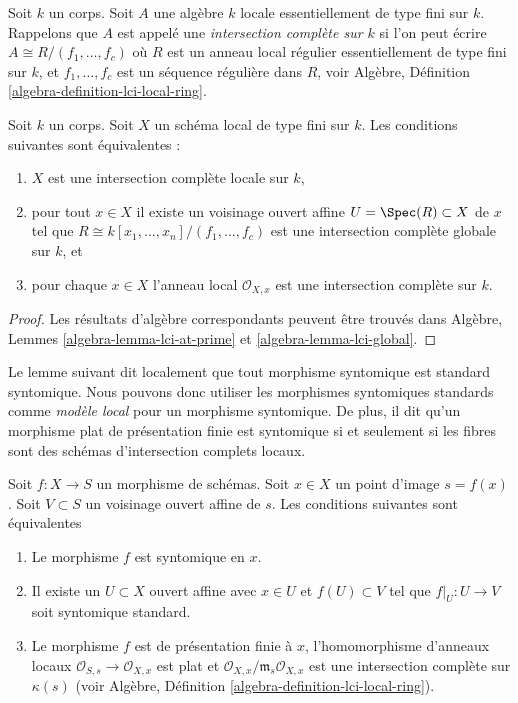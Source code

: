 \noindent
Soit $k$ un corps. Soit $A$ une algèbre $k$ locale
essentiellement de type fini sur $k$. Rappelons que
$A$ est appelé une {\it intersection
complète sur $k$} si l'on peut écrire $A \cong R/(f_1, \ldots, f_c)$ où $R$
est un anneau local régulier essentiellement de type fini sur $k$,
et $f_1, \ldots, f_c$ est un séquence
régulière dans $R$, voir Algèbre, Définition \ref{algebra-definition-lci-local-ring}.

\begin{lemma}
\label{lemma-local-complete-intersection}
Soit $k$ un corps.
Soit $X$ un schéma local de type fini sur $k$. Les conditions
suivantes sont équivalentes :
\begin{enumerate}
\item $X$ est une intersection complète locale sur $k$,
\item pour tout $x \in X$ il existe un voisinage
ouvert affine $U = \Spec(R) \subset X$ de $x$
tel que $R \cong k[x_1, \ldots, x_n]/(f_1, \ldots, f_c)$ est une intersection
complète globale sur $k$, et
\item pour chaque $x \in X$ l'anneau local $\mathcal{O}_{X, x}$ est une intersection
complète sur $k$.
\end{enumerate}
\end{lemma}

\begin{proof}
Les résultats d'algèbre correspondants peuvent
être trouvés dans Algèbre, Lemmes \ref{algebra-lemma-lci-at-prime}
et \ref{algebra-lemma-lci-global}.
\end{proof}

\noindent
Le lemme suivant dit localement que tout morphisme syntomique est standard syntomique. Nous pouvons
donc utiliser les morphismes syntomiques standards comme {\it modèle
local} pour un morphisme syntomique. De plus, il dit qu'un morphisme plat de présentation
finie est syntomique si et seulement si les fibres sont des schémas d'intersection
complets locaux.

\begin{lemma}
\label{lemma-syntomic-locally-standard-syntomic}
Soit $f : X  \to S$ un morphisme de schémas. Soit $x \in X$ un point d'image
$s = f(x)$. Soit $V \subset S$ un voisinage ouvert affine de $s$. Les conditions
suivantes sont équivalentes
\begin{enumerate}
\item Le morphisme $f$ est syntomique en $x$.
\item Il existe un $U \subset X$ ouvert affine avec $x \in U$ et
$f(U) \subset V$ tel que $f|_U : U \to V$ soit syntomique standard.
\item Le morphisme $f$ est de présentation finie
à $x$, l'homomorphisme d'anneaux locaux
$\mathcal{O}_{S, s} \to \mathcal{O}_{X, x}$ est plat et $\mathcal{O}_{X, x}/\mathfrak m_s \mathcal{O}_{X, x}$ est
une intersection complète sur $\kappa(s)$
(voir Algèbre, Définition \ref{algebra-definition-lci-local-ring}).
\end{enumerate}
\end{lemma}


